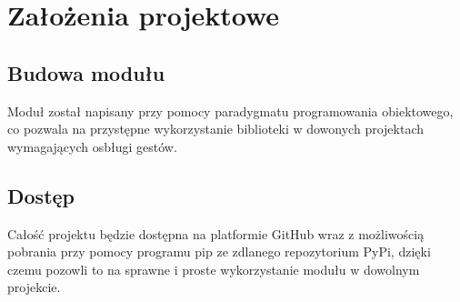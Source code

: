\chapter{Założenia projektowe}

\section{Budowa modułu}
Moduł został napisany przy pomocy paradygmatu programowania
obiektowego, co pozwala na przystępne wykorzystanie biblioteki w dowonych 
projektach wymagających osbługi gestów. 

\section{Dostęp}
Całość projektu będzie dostępna na platformie GitHub wraz z możliwością 
pobrania przy pomocy programu pip ze zdlanego repozytorium PyPi, dzięki czemu 
pozowli to na sprawne i proste wykorzystanie modułu w dowolnym 
projekcie. 